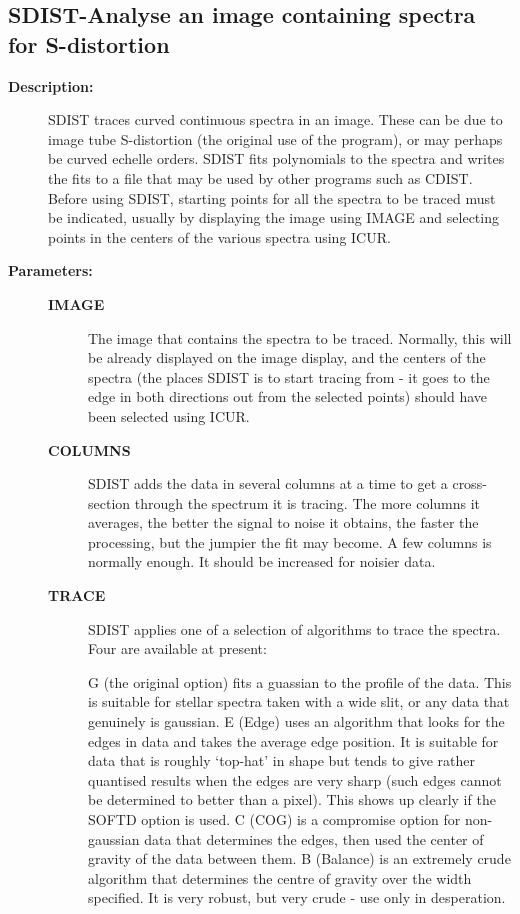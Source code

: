\subsection{SDIST-\label{SDIST}Analyse an image containing spectra for S-distortion}
\begin{description}

\item [\textbf{Description:}]
 SDIST traces curved continuous spectra in an image.  These can be
 due to image tube S-distortion (the original use of the program),
 or may perhaps be curved echelle orders.  SDIST fits polynomials
 to the spectra and writes the fits to a file that may be used by
 other programs such as CDIST.  Before using SDIST, starting points
 for all the spectra to be traced must be indicated, usually by
 displaying the image using IMAGE and selecting points in the
 centers of the various spectra using ICUR.

\item [\textbf{Parameters:}]
\begin{description}
\item [\textbf{IMAGE}]
 The image that contains the spectra to be traced.
 Normally, this will be already displayed on the image display, and
 the centers of the spectra (the places SDIST is to start tracing from
 - it goes to the edge in both directions out from the selected
 points) should have been selected using ICUR.
\item [\textbf{COLUMNS}]
 SDIST adds the data in several columns at a time to get a
 cross-section through the spectrum it is tracing.  The more columns
 it averages, the better the signal to noise it obtains, the faster
 the processing, but the jumpier the fit may become.  A few columns is
 normally enough.  It should be increased for noisier data.
\item [\textbf{TRACE}]
 SDIST applies one of a selection of algorithms to trace
 the spectra. Four are available at present:

    G (the original option) fits a guassian to the profile of the data.
      This is suitable for stellar spectra taken with a wide slit, or
      any data that genuinely is gaussian.
    E (Edge) uses an algorithm that looks for the edges in data and
      takes the average edge position. It is suitable for data that is
      roughly `top-hat' in shape but tends to give rather quantised
      results when the edges are very sharp (such edges cannot be
      determined to better than a pixel). This shows up clearly if the
      SOFTD option is used.
    C (COG) is a compromise option for non-gaussian data that determines
      the edges, then used the center of gravity of the data between
      them.
    B (Balance) is an extremely crude algorithm that determines the
      centre of gravity over the width specified. It is very robust, but
      very crude - use only in desperation.


\end{description}
\end{description}
